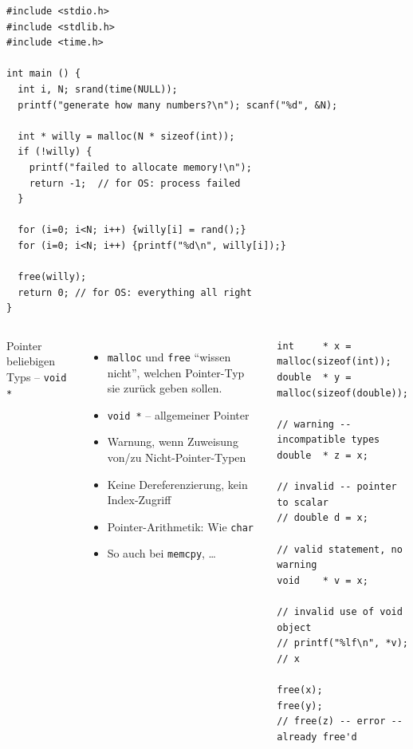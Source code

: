 \begin{frame}[fragile]
%

\begin{codebox}
\begin{verbatim}
#include <stdio.h>
#include <stdlib.h>
#include <time.h>

int main () {
  int i, N; srand(time(NULL));
  printf("generate how many numbers?\n"); scanf("%d", &N);
  
  int * willy = malloc(N * sizeof(int));
  if (!willy) {
    printf("failed to allocate memory!\n");
    return -1;	// for OS: process failed
  }
  
  for (i=0; i<N; i++) {willy[i] = rand();}
  for (i=0; i<N; i++) {printf("%d\n", willy[i]);}
  
  free(willy);
  return 0; // for OS: everything all right
}
\end{verbatim}
\end{codebox}
%
\end{frame}


\begin{frame}[fragile]
%
\begin{columns}[T]
\begin{Large}
Pointer beliebigen Typs -- \texttt{void *}
\end{Large}
%
\begin{itemize}
\item \texttt{malloc} und \texttt{free} \enquote{wissen nicht}, welchen Pointer-Typ sie zurück geben sollen.
\item \texttt{void *} -- allgemeiner Pointer
\item Warnung, wenn Zuweisung von/zu Nicht-Pointer-Typen
\item Keine Dereferenzierung, kein Index-Zugriff
\item Pointer-Arithmetik: Wie \texttt{char}
\item So auch bei \texttt{memcpy}, \ldots
\end{itemize}
%
\begin{codebox}
\begin{verbatim}
int     * x = malloc(sizeof(int));
double  * y = malloc(sizeof(double));

// warning -- incompatible types
double  * z = x;

// invalid -- pointer to scalar
// double d = x;

// valid statement, no warning
void    * v = x;

// invalid use of void object
// printf("%lf\n", *v);  // x

free(x);
free(y);
// free(z) -- error -- already free'd
\end{verbatim}
\end{codebox}
\end{columns}

%
\end{frame}

